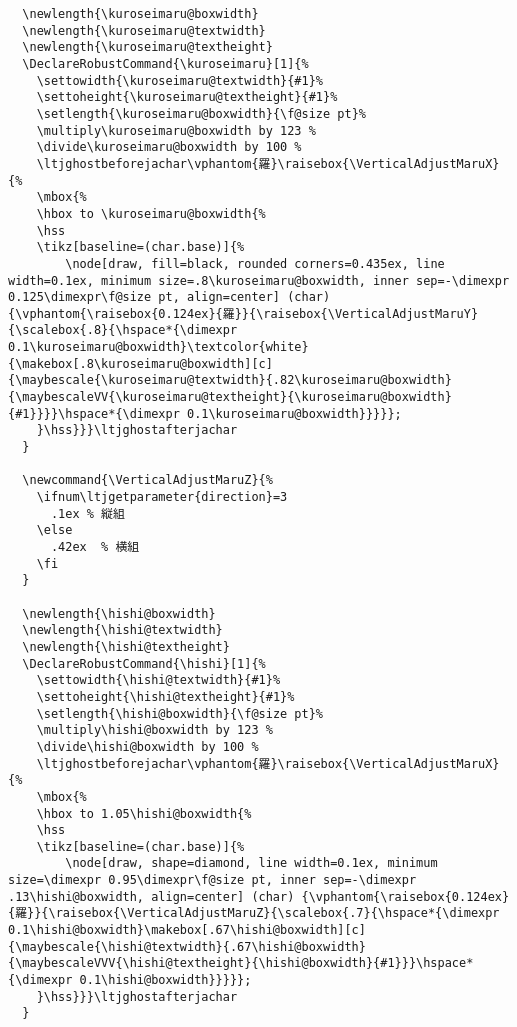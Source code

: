 \documentclass[luatex,fontsize=10pt,paper=b5,twoside]{jlreq}%
\begin{document}
\begin{lstlisting}
  \newlength{\kuroseimaru@boxwidth}
  \newlength{\kuroseimaru@textwidth}
  \newlength{\kuroseimaru@textheight}
  \DeclareRobustCommand{\kuroseimaru}[1]{%
    \settowidth{\kuroseimaru@textwidth}{#1}%
    \settoheight{\kuroseimaru@textheight}{#1}%
    \setlength{\kuroseimaru@boxwidth}{\f@size pt}%
    \multiply\kuroseimaru@boxwidth by 123 %
    \divide\kuroseimaru@boxwidth by 100 %
    \ltjghostbeforejachar\vphantom{羅}\raisebox{\VerticalAdjustMaruX}{%
    \mbox{%
    \hbox to \kuroseimaru@boxwidth{%
    \hss
    \tikz[baseline=(char.base)]{%
        \node[draw, fill=black, rounded corners=0.435ex, line width=0.1ex, minimum size=.8\kuroseimaru@boxwidth, inner sep=-\dimexpr 0.125\dimexpr\f@size pt, align=center] (char) {\vphantom{\raisebox{0.124ex}{羅}}{\raisebox{\VerticalAdjustMaruY}{\scalebox{.8}{\hspace*{\dimexpr 0.1\kuroseimaru@boxwidth}\textcolor{white}{\makebox[.8\kuroseimaru@boxwidth][c]{\maybescale{\kuroseimaru@textwidth}{.82\kuroseimaru@boxwidth}{\maybescaleVV{\kuroseimaru@textheight}{\kuroseimaru@boxwidth}{#1}}}}\hspace*{\dimexpr 0.1\kuroseimaru@boxwidth}}}}};
    }\hss}}}\ltjghostafterjachar
  }

  \newcommand{\VerticalAdjustMaruZ}{%
    \ifnum\ltjgetparameter{direction}=3
      .1ex % 縦組
    \else
      .42ex  % 横組
    \fi
  }

  \newlength{\hishi@boxwidth}
  \newlength{\hishi@textwidth}
  \newlength{\hishi@textheight}
  \DeclareRobustCommand{\hishi}[1]{%
    \settowidth{\hishi@textwidth}{#1}%
    \settoheight{\hishi@textheight}{#1}%
    \setlength{\hishi@boxwidth}{\f@size pt}%
    \multiply\hishi@boxwidth by 123 %
    \divide\hishi@boxwidth by 100 %
    \ltjghostbeforejachar\vphantom{羅}\raisebox{\VerticalAdjustMaruX}{%
    \mbox{%
    \hbox to 1.05\hishi@boxwidth{%
    \hss
    \tikz[baseline=(char.base)]{%
        \node[draw, shape=diamond, line width=0.1ex, minimum size=\dimexpr 0.95\dimexpr\f@size pt, inner sep=-\dimexpr .13\hishi@boxwidth, align=center] (char) {\vphantom{\raisebox{0.124ex}{羅}}{\raisebox{\VerticalAdjustMaruZ}{\scalebox{.7}{\hspace*{\dimexpr 0.1\hishi@boxwidth}\makebox[.67\hishi@boxwidth][c]{\maybescale{\hishi@textwidth}{.67\hishi@boxwidth}{\maybescaleVVV{\hishi@textheight}{\hishi@boxwidth}{#1}}}\hspace*{\dimexpr 0.1\hishi@boxwidth}}}}};
    }\hss}}}\ltjghostafterjachar
  }


\end{lstlisting}
\end{document}
